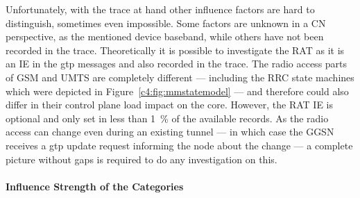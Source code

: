 Unfortunately, with the trace at hand other influence factors are hard to distinguish, sometimes even impossible. Some factors are unknown in a \gls{CN} perspective, as the mentioned device baseband, while others have not been recorded in the trace.
Theoretically it is possible to investigate the \gls{RAT} as it is an \gls{IE} in the \gls{gtp} messages and also recorded in the trace. The radio access parts of \gls{GSM} and \gls{UMTS} are completely different --- including the \gls{RRC} state machines which were depicted in Figure~\ref{c4:fig:mmstatemodel} --- and therefore could also differ in their control plane load impact on the core. However, the \gls{RAT} \gls{IE} is optional and only set in less than \SI{1}{\percent} of the available records. As the radio access can change even during an existing tunnel --- in which case the \gls{GGSN} receives a \gls{gtp} update request informing the node about the change --- a complete picture without gaps is required to do any investigation on this.



\paragraph{Influence Strength of the Categories}


